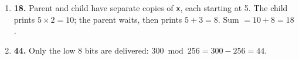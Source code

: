 \documentclass[11pt]{article}
\begin{document}
\begin{enumerate}
\item[\textbf{Q9}] \textbf{18.} Parent and child have separate copies of \texttt{x}, each starting at 5. The child prints $5 \times 2 = 10$; the parent waits, then prints $5 + 3 = 8$. Sum $= 10 + 8 = 18$.

\item[\textbf{Q10}] \textbf{44.} Only the low 8 bits are delivered: $300 \bmod 256 = 300 - 256 = 44$.

\end{enumerate}
\end{document}
